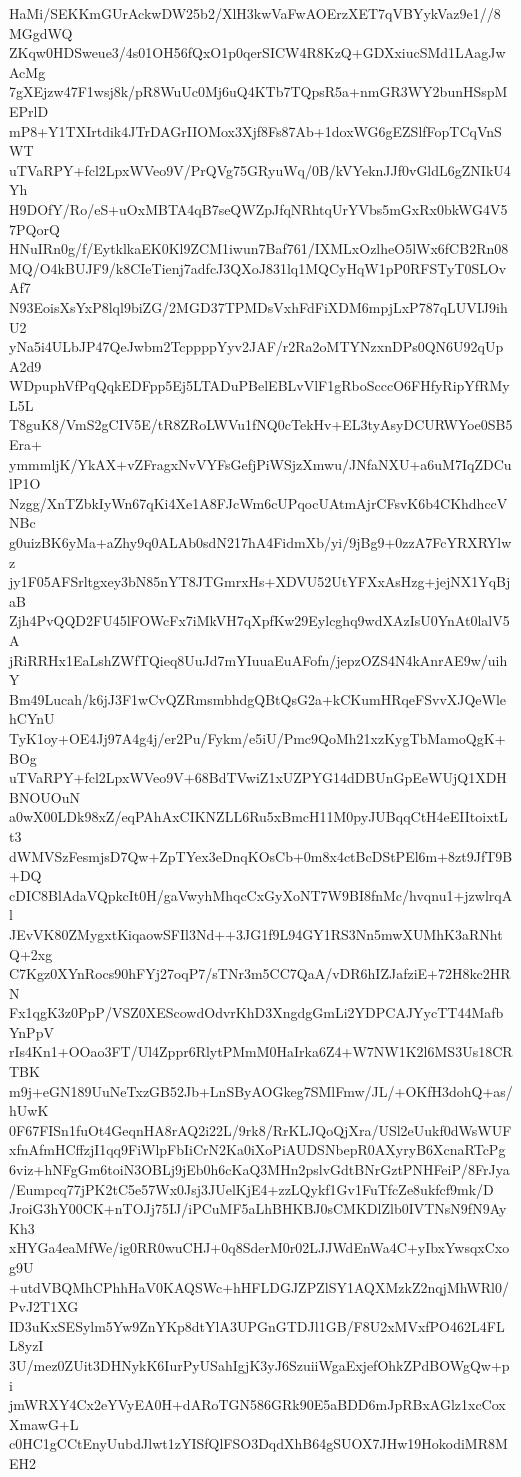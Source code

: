 HaMi/SEKKmGUrAckwDW25b2/XlH3kwVaFwAOErzXET7qVBYykVaz9e1//8MGgdWQ
ZKqw0HDSweue3/4s01OH56fQxO1p0qerSICW4R8KzQ+GDXxiucSMd1LAagJwAcMg
7gXEjzw47F1wsj8k/pR8WuUc0Mj6uQ4KTb7TQpsR5a+nmGR3WY2bunHSspMEPrlD
mP8+Y1TXIrtdik4JTrDAGrIIOMox3Xjf8Fs87Ab+1doxWG6gEZSlfFopTCqVnSWT
uTVaRPY+fcl2LpxWVeo9V/PrQVg75GRyuWq/0B/kVYeknJJf0vGldL6gZNIkU4Yh
H9DOfY/Ro/eS+uOxMBTA4qB7seQWZpJfqNRhtqUrYVbs5mGxRx0bkWG4V57PQorQ
HNuIRn0g/f/EytklkaEK0Kl9ZCM1iwun7Baf761/IXMLxOzlheO5lWx6fCB2Rn08
MQ/O4kBUJF9/k8CIeTienj7adfcJ3QXoJ831lq1MQCyHqW1pP0RFSTyT0SLOvAf7
N93EoisXsYxP8lql9biZG/2MGD37TPMDsVxhFdFiXDM6mpjLxP787qLUVIJ9ihU2
yNa5i4ULbJP47QeJwbm2TcppppYyv2JAF/r2Ra2oMTYNzxnDPs0QN6U92qUpA2d9
WDpuphVfPqQqkEDFpp5Ej5LTADuPBelEBLvVlF1gRboScccO6FHfyRipYfRMyL5L
T8guK8/VmS2gCIV5E/tR8ZRoLWVu1fNQ0cTekHv+EL3tyAsyDCURWYoe0SB5Era+
ymmmljK/YkAX+vZFragxNvVYFsGefjPiWSjzXmwu/JNfaNXU+a6uM7IqZDCulP1O
Nzgg/XnTZbkIyWn67qKi4Xe1A8FJcWm6cUPqocUAtmAjrCFsvK6b4CKhdhccVNBc
g0uizBK6yMa+aZhy9q0ALAb0sdN217hA4FidmXb/yi/9jBg9+0zzA7FcYRXRYlwz
jy1F05AFSrltgxey3bN85nYT8JTGmrxHs+XDVU52UtYFXxAsHzg+jejNX1YqBjaB
Zjh4PvQQD2FU45lFOWcFx7iMkVH7qXpfKw29Eylcghq9wdXAzIsU0YnAt0lalV5A
jRiRRHx1EaLshZWfTQieq8UuJd7mYIuuaEuAFofn/jepzOZS4N4kAnrAE9w/uihY
Bm49Lucah/k6jJ3F1wCvQZRmsmbhdgQBtQsG2a+kCKumHRqeFSvvXJQeWlehCYnU
TyK1oy+OE4Jj97A4g4j/er2Pu/Fykm/e5iU/Pmc9QoMh21xzKygTbMamoQgK+BOg
uTVaRPY+fcl2LpxWVeo9V+68BdTVwiZ1xUZPYG14dDBUnGpEeWUjQ1XDHBNOUOuN
a0wX00LDk98xZ/eqPAhAxCIKNZLL6Ru5xBmcH11M0pyJUBqqCtH4eEIItoixtLt3
dWMVSzFesmjsD7Qw+ZpTYex3eDnqKOsCb+0m8x4ctBcDStPEl6m+8zt9JfT9B+DQ
cDIC8BlAdaVQpkcIt0H/gaVwyhMhqcCxGyXoNT7W9BI8fnMc/hvqnu1+jzwlrqAl
JEvVK80ZMygxtKiqaowSFIl3Nd++3JG1f9L94GY1RS3Nn5mwXUMhK3aRNhtQ+2xg
C7Kgz0XYnRocs90hFYj27oqP7/sTNr3m5CC7QaA/vDR6hIZJafziE+72H8kc2HRN
Fx1qgK3z0PpP/VSZ0XEScowdOdvrKhD3XngdgGmLi2YDPCAJYycTT44MafbYnPpV
rIs4Kn1+OOao3FT/Ul4Zppr6RlytPMmM0HaIrka6Z4+W7NW1K2l6MS3Us18CRTBK
m9j+eGN189UuNeTxzGB52Jb+LnSByAOGkeg7SMlFmw/JL/+OKfH3dohQ+as/hUwK
0F67FISn1fuOt4GeqnHA8rAQ2i22L/9rk8/RrKLJQoQjXra/USl2eUukf0dWsWUF
xfnAfmHCffzjI1qq9FiWlpFbIiCrN2Ka0iXoPiAUDSNbepR0AXyryB6XcnaRTcPg
6viz+hNFgGm6toiN3OBLj9jEb0h6cKaQ3MHn2pslvGdtBNrGztPNHFeiP/8FrJya
/Eumpcq77jPK2tC5e57Wx0Jsj3JUelKjE4+zzLQykf1Gv1FuTfcZe8ukfcf9mk/D
JroiG3hY00CK+nTOJj75IJ/iPCuMF5aLhBHKBJ0sCMKDlZlb0IVTNsN9fN9AyKh3
xHYGa4eaMfWe/ig0RR0wuCHJ+0q8SderM0r02LJJWdEnWa4C+yIbxYwsqxCxog9U
+utdVBQMhCPhhHaV0KAQSWc+hHFLDGJZPZlSY1AQXMzkZ2nqjMhWRl0/PvJ2T1XG
ID3uKxSESylm5Yw9ZnYKp8dtYlA3UPGnGTDJl1GB/F8U2xMVxfPO462L4FLL8yzI
3U/mez0ZUit3DHNykK6IurPyUSahIgjK3yJ6SzuiiWgaExjefOhkZPdBOWgQw+pi
jmWRXY4Cx2eYVyEA0H+dARoTGN586GRk90E5aBDD6mJpRBxAGlz1xcCoxXmawG+L
c0HC1gCCtEnyUubdJlwt1zYISfQlFSO3DqdXhB64gSUOX7JHw19HokodiMR8MEH2

